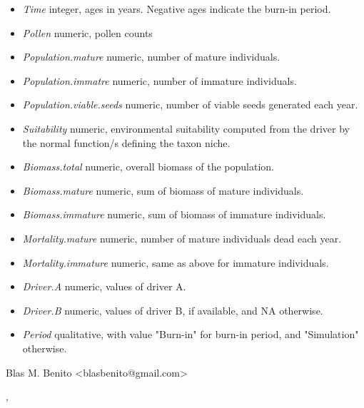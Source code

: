 \documentclass[letterpaper]{book}
\begin{document}
\begin{Details}\relax
\begin{itemize}

\item \emph{Time} integer, ages in years. Negative ages indicate the burn-in period.
\item \emph{Pollen} numeric, pollen counts
\item \emph{Population.mature} numeric, number of mature individuals.
\item \emph{Population.immatre} numeric, number of immature individuals.
\item \emph{Population.viable.seeds} numeric, number of viable seeds generated each year.
\item \emph{Suitability} numeric, environmental suitability computed from the driver by the normal function/s defining the taxon niche.
\item \emph{Biomass.total} numeric, overall biomass of the population.
\item \emph{Biomass.mature} numeric, sum of biomass of mature individuals.
\item \emph{Biomass.immature} numeric, sum of biomass of immature individuals.
\item \emph{Mortality.mature} numeric, number of mature individuals dead each year.
\item \emph{Mortality.immature} numeric, same as above for immature individuals.
\item \emph{Driver.A} numeric, values of driver A.
\item \emph{Driver.B} numeric, values of driver B, if available, and NA otherwise.
\item \emph{Period} qualitative, with value "Burn-in" for burn-in period, and "Simulation" otherwise.

\end{itemize}

\end{Details}
%
\begin{Author}\relax
Blas M. Benito  <blasbenito@gmail.com>
\end{Author}
%
\begin{SeeAlso}\relax
{}, 
\end{SeeAlso}
\printindex{}
\end{document}
